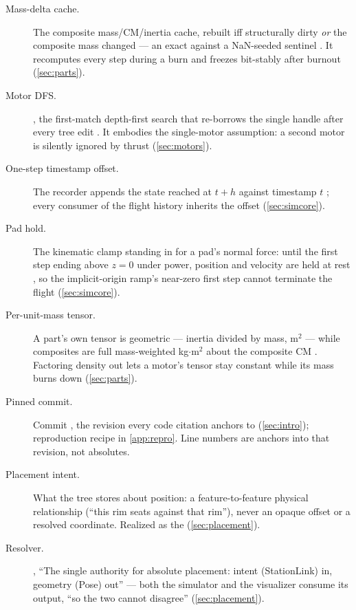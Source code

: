 \begin{description}
\item[Mass-delta cache.] The composite mass/CM/inertia cache, rebuilt iff structurally
  dirty \emph{or} the composite mass changed --- an exact \code{!=} against a NaN-seeded
  sentinel . It recomputes every step during a burn and
  freezes bit-stably after burnout (\cref{sec:parts}).

\item[Motor DFS.] , the first-match depth-first search that
  re-borrows the single  handle after every tree edit
  . It embodies the single-motor assumption: a second motor
  is silently ignored by thrust (\cref{sec:motors}).

\item[One-step timestamp offset.] The recorder appends the state reached at $t+h$ against
  timestamp $t$ ; every consumer of the flight history
  inherits the offset (\cref{sec:simcore}).

\item[Pad hold.] The kinematic clamp standing in for a pad's normal force: until the first
  step ending above $z=0$ under power, position and velocity are held at rest
  , so the implicit-origin ramp's near-zero first step cannot
  terminate the flight (\cref{sec:simcore}).

\item[Per-unit-mass tensor.] A part's own tensor is geometric --- inertia divided by mass,
  m$^2$ --- while composites are full mass-weighted kg$\cdot$m$^2$ about the composite CM
  . Factoring density out lets a motor's tensor stay constant
  while its mass burns down (\cref{sec:parts}).

\item[Pinned commit.] Commit , the revision every code citation anchors to
  (\cref{sec:intro}); reproduction recipe in \cref{app:repro}. Line numbers are anchors
  into that revision, not absolutes.

\item[Placement intent.] What the tree stores about position: a feature-to-feature
  physical relationship (``this rim seats against that rim''), never an opaque offset or a
  resolved coordinate. Realized as the  (\cref{sec:placement}).

\item[Resolver.] , ``The single authority for absolute placement:
  intent (StationLink) in, geometry (Pose) out'' --- both the simulator and the visualizer
  consume its output, ``so the two cannot disagree'' 
  (\cref{sec:placement}).


\end{description}
